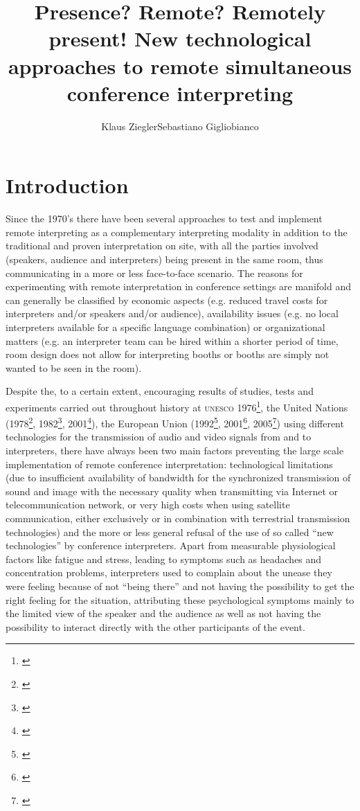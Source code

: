 \documentclass[output=paper]{langsci/langscibook}
\author{Klaus Ziegler\affiliation{AIIC Technical Committee}\lastand Sebastiano Gigliobianco\affiliation{SDI München}}
\title{Presence? Remote? Remotely present! New technological approaches to remote simultaneous conference interpreting}
\begin{document}
\section{Introduction}
\label{sec:ziegler:01}
Since the 1970’s there have been several approaches to test and implement remote interpreting as a complementary interpreting modality in addition to the traditional and proven interpretation on site, with all the parties involved (speakers, audience and interpreters) being present in the same room, thus communicating in a more or less face-to-face scenario. The reasons for experimenting with remote interpretation in conference settings are manifold and can generally be classified by economic aspects (e.g. reduced travel costs for interpreters and/or speakers and/or audience), availability issues (e.g. no local interpreters available for a specific language combination) or organizational matters (e.g. an interpreter team can be hired within a shorter period of time, room design does not allow for interpreting booths or booths are simply not wanted to be seen in the room). 

Despite the, to a certain extent, encouraging results of studies, tests and experiments carried out throughout history at \textsc{unesco} 1976\footnote{\citealt{Kurz2000}}, the United Nations (1978\footnote{\citealt{Chernov2004}}, 1982\footnote{\citet{UNESCO1987}}, 2001\footnote{\citealt{Mouzourakis2006}}), the European Union (1992\footnote{\citealt{Kurz2000}}, 2001\footnote{\citealt{Europarl2001}}, 2005\footnote{\citealt{Roziner2010}}) using different technologies for the transmission of audio and video signals from and to interpreters, there have always been two main factors preventing the large scale implementation of remote conference interpretation: technological limitations (due to insufficient availability of bandwidth for the synchronized transmission of sound and image with the necessary quality when transmitting via Internet or telecommunication network, or very high costs when using satellite communication, either exclusively or in combination with terrestrial transmission technologies) and the more or less general refusal of the use of so called “new technologies” by conference interpreters. Apart from measurable physiological factors like fatigue and stress, leading to symptoms such as headaches and concentration problems, interpreters used to complain about the unease they were feeling because of not “being there” \citep{Mouzourakis2006} and not having the possibility to get the right feeling for the situation, attributing these psychological symptoms mainly to the limited view of the speaker and the audience as well as not having the possibility to interact directly with the other participants of the event.
\end{document}

